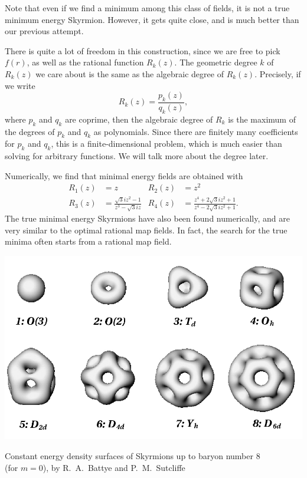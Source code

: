 \documentclass[a4paper]{article}
\begin{document}
Note that even if we find a minimum among this class of fields, it is not a true minimum energy Skyrmion. However, it gets quite close, and is much better than our previous attempt.

There is quite a lot of freedom in this construction, since we are free to pick $f(r)$, as well as the rational function $R_k(z)$. The geometric degree $k$ of $R_k(z)$ we care about is the same as the algebraic degree of $R_k(z)$. Precisely, if we write
\[
  R_k(z) = \frac{p_k(z)}{q_k(z)},
\]
where $p_k$ and $q_k$ are coprime, then the algebraic degree of $R_k$ is the maximum of the degrees of $p_k$ and $q_k$ as polynomials. Since there are finitely many coefficients for $p_k$ and $q_k$, this is a finite-dimensional problem, which is much easier than solving for arbitrary functions. We will talk more about the degree later.

Numerically, we find that minimal energy fields are obtained with
\begin{align*}
  R_1(z) &= z & R_2(z) &= z^2\\
  R_3(z) &= \frac{\sqrt{3}i z^2 - 1}{z^3 - \sqrt{3}i z} & R_4(z) &= \frac{z^4 + 2\sqrt{3} i z^2 + 1}{z^4 - 2\sqrt{3} i z^2 + 1}.
\end{align*}
The true minimal energy Skyrmions have also been found numerically, and are very similar to the optimal rational map fields. In fact, the search for the true minima often starts from a rational map field.
\begin{center}
  \includegraphics[width=\textwidth]{images/B1-8-Skyrmions.pdf}

  {Constant energy density surfaces of Skyrmions up to baryon number 8 \\(for $m = 0$), by R.\ A.\ Battye and P.\ M.\ Sutcliffe}
\end{center}
\end{document}

